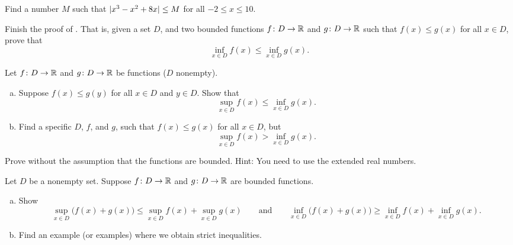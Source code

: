 \begin{exercise}
Find a number $M$ such that $\lvert {x^3-x^2+8x} \rvert \leq M$ for all $-2 \leq x \leq
10$.
\end{exercise}

\begin{exercise} \label{exercise:finishfuncsupinf}
Finish the proof of .
That is,
given a set $D$,
and two bounded functions
$f \colon D \to {\mathbb{R}}$ and $g \colon D \to {\mathbb{R}}$
such that $f(x) \leq g(x)$ for all $x \in D$, prove that
\begin{equation*}
\inf_{x\in D} f(x) \leq \inf_{x\in D} g(x) .
\end{equation*}
\end{exercise}

\begin{exercise} \label{exercise:supinffuncineq}
Let
$f \colon D \to {\mathbb{R}}$ and $g \colon D \to {\mathbb{R}}$ be functions ($D$ nonempty).
\begin{enumerate}[a)]
%
\item
Suppose
$f(x) \leq g(y)$ for all $x \in D$ and $y \in D$.  Show that
\begin{equation*}
\sup_{x\in D} f(x) \leq \inf_{x\in D} g(x) .
\end{equation*}
%
\item
Find a specific $D$, $f$, and $g$, such that
$f(x) \leq g(x)$ for all $x \in D$, but
\begin{equation*}
\sup_{x\in D} f(x) > \inf_{x\in D} g(x) .
\end{equation*}
\end{enumerate}
\end{exercise}

\begin{exercise}
Prove  without the assumption that
the functions are bounded.  Hint: You need to use the extended real
numbers.
\end{exercise}

\begin{exercise} \label{exercise:sumofsup}
\pagebreak[2]
Let $D$ be a nonempty set.
Suppose $f \colon D \to {\mathbb{R}}$ and $g \colon D \to {\mathbb{R}}$ are bounded functions.
\begin{enumerate}[a)]
\item
Show
\begin{equation*}
\sup_{x\in D} \bigl(f(x) + g(x) \bigr) \leq
\sup_{x\in D} f(x)
+
\sup_{x\in D} g(x)
\qquad \text{and}
\qquad
\inf_{x\in D} \bigl(f(x) + g(x) \bigr) \geq
\inf_{x\in D} f(x)
+
\inf_{x\in D} g(x) .
\end{equation*}
\item
Find an example (or examples) where we obtain strict inequalities.
\end{enumerate}
\end{exercise}

